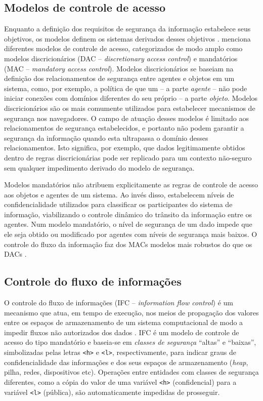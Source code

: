 \subsection{Modelos de controle de acesso}
Enquanto a definição dos requisitos de segurança da informação estabelece seus objetivos, os modelos definem os sistemas derivados desses objetivos \cite{Goguen1982}. \cite{Foster1998} menciona diferentes modelos de controle de acesso, categorizados de modo amplo como modelos discricionários (DAC -- \textit{discretionary access control}) e mandatórios (MAC -- \textit{mandatory access control}). Modelos discricionários se baseiam na definição dos relacionamentos de segurança entre agentes e objetos em um sistema, como, por exemplo, a política de que um {\script} -- a parte \textit{agente} -- não pode iniciar conexões com domínios diferentes do seu próprio -- a parte \textit{objeto}. Modelos discricionários são os mais comumente utilizados para estabelecer mecanismos de segurança nos navegadores. O campo de atuação desses modelos é limitado aos relacionamentos de segurança estabelecidos, e portanto não podem garantir a segurança da informação quando esta ultrapassa o domínio desses relacionamentos. Isto significa, por exemplo, que dados legitimamente obtidos dentro de regras discricionárias pode ser replicado para um contexto não-seguro sem qualquer impedimento derivado do modelo de segurança.

Modelos mandatórios não atribuem explicitamente as regras de controle de acesso aos objetos e agentes de um sistema. Ao invés disso, estabelecem níveis de confidencialidade utilizados para classificar os participantes do sistema de informação, viabilizando o controle dinâmico do trânsito da informação entre os agentes. Num modelo mandatório, o nível de segurança de um dado impede que ele seja obtido ou modificado por agentes com níveis de segurança mais baixos. O controle do fluxo da informação faz dos MACs modelos mais robustos do que os DACs \cite{Foster1998}.

\subsection{Controle do fluxo de informações}
O controle do fluxo de informações (IFC -- \textit{information flow control}) é um mecanismo que atua, em tempo de execução, nos meios de propagação dos valores entre os espaços de armazenamento de um sistema computacional de modo a impedir fluxos não autorizados dos dados \cite{Denning1976}. IFC é um modelo de controle de acesso do tipo mandatório e baseia-se em \textit{classes de segurança} ``altas'' e ``baixas'', simbolizadas pelas letras \texttt{<h>} e \texttt{<l>}, respectivamente, para indicar graus de confidencialidade das informações e dos seus espaços de armazenamento (\textit{heap}, pilha, redes, dispositivos etc). Operações entre entidades com classes de segurança diferentes, como a cópia do valor de uma variável \texttt{<h>} (confidencial) para a variável \texttt{<l>} (pública), são automaticamente impedidas de prosseguir.

